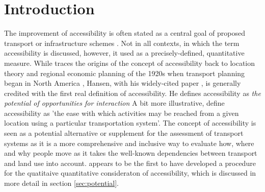 \section{Introduction}
The improvement of accessibility is often stated as a central goal of proposed transport or infrastructure 
schemes \citep{GeursEtAl2012AccessibilityTransportIntroduction}. Not in all contexts, in which the term 
accessibility is discussed, however, it used as a precisely-defined, quantitative measure. While 
\citet{Batty2009AccessibilityUnifiedTheory} traces the origins of the concept of accessibility back to 
location theory and regional economic planning of the 1920s when transport planning began in North America
\citep{GeursEtAl2012AccessibilityTransportIntroduction}, 
Hansen, with his widely-cited paper \citep{Hansen1959HowAccessibilityShapesLandUse}, is generally credited 
with the first real definition of accessibility. He defines accessibility 
as \textit{the potential of opportunities for interaction} 
A bit more illustrative, \citet{MorrisEtAl1978AccessibilityIndicators} define accessibility as 'the ease with 
which activities may be reached from a given location using a particular transportation system'.
The concept of accessibility is seen as a potential alternative or supplement for the assessment 
of transport systems as it is a more comprehensive and inclusive way to evaluate how, where and why 
people move as it takes the well-known dependencies between transport and land use into account.
\citet{Hansen1959HowAccessibilityShapesLandUse} appears to be the first to have developed a procedure for 
the quatitaive quantitative consideraton of accessibility, which is discussed in more detail in section 
\ref{sec:potential}.



